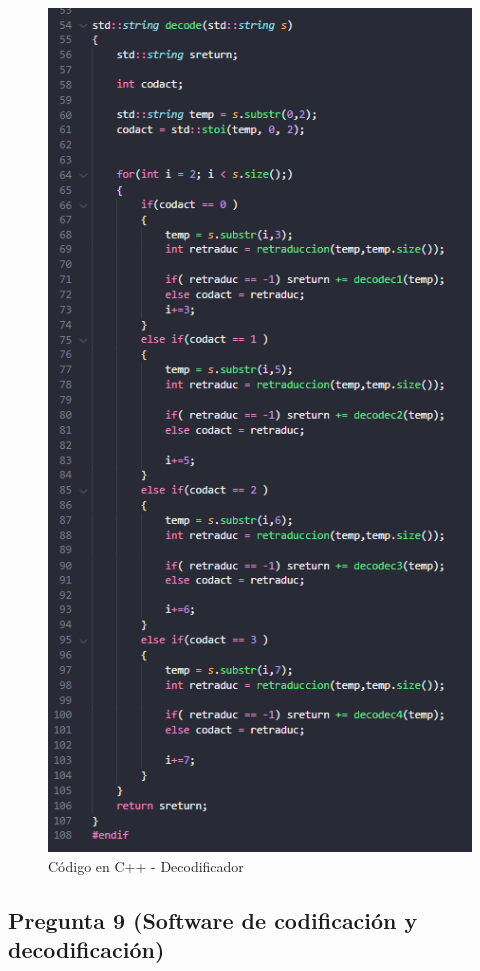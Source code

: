 \begin{figure}[H]
    \centering
    \includegraphics[scale = 0.4]{imagenes/decode.png}
    \caption{Código en C++ - Decodificador}
\end{figure}


\subsection{Pregunta 9 (Software de codificación y decodificación)}

